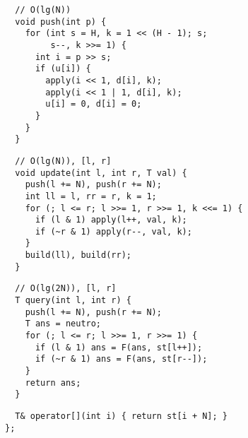 \documentclass[twoside]{article}
\begin{document}
\begin{multicols*}{2}
\begin{verbatim}
  // O(lg(N))
  void push(int p) {
    for (int s = H, k = 1 << (H - 1); s;
         s--, k >>= 1) {
      int i = p >> s;
      if (u[i]) {
        apply(i << 1, d[i], k);
        apply(i << 1 | 1, d[i], k);
        u[i] = 0, d[i] = 0;
      }
    }
  }
\end{verbatim}
\vspace{-12pt}
\begin{verbatim}
  // O(lg(N)), [l, r]
  void update(int l, int r, T val) {
    push(l += N), push(r += N);
    int ll = l, rr = r, k = 1;
    for (; l <= r; l >>= 1, r >>= 1, k <<= 1) {
      if (l & 1) apply(l++, val, k);
      if (~r & 1) apply(r--, val, k);
    }
    build(ll), build(rr);
  }
\end{verbatim}
\vspace{-12pt}
\begin{verbatim}
  // O(lg(2N)), [l, r]
  T query(int l, int r) {
    push(l += N), push(r += N);
    T ans = neutro;
    for (; l <= r; l >>= 1, r >>= 1) {
      if (l & 1) ans = F(ans, st[l++]);
      if (~r & 1) ans = F(ans, st[r--]);
    }
    return ans;
  }
\end{verbatim}
\vspace{-12pt}
\begin{verbatim}
  T& operator[](int i) { return st[i + N]; }
};
\end{verbatim}

\subsubsectionfont{\large\bfseries\sffamily\underline}

\end{multicols*}
\end{document}
